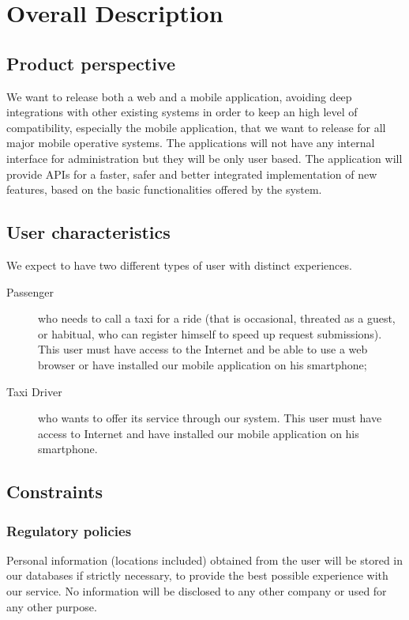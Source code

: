 \documentclass{article}
\begin{document}
\section{Overall Description}
	\subsection{Product perspective}
		We want to release both a web and a mobile application, avoiding deep
		integrations with other existing systems in order to keep an high level
		of compatibility, especially the mobile application, that we want to
		release for all major mobile operative systems. The applications will not
		have any internal interface for administration but they will be only user based.
		The application will provide APIs for a faster, safer and better integrated 
		implementation of new features, based on the basic functionalities
		offered by the system.
	\subsection{User characteristics}
		We expect to have two different types of user with distinct experiences. 
		\begin{description}
			\item[Passenger] who needs to call a taxi for a ride (that is occasional, threated
			as a guest, or habitual, who can register himself to speed up request submissions).
			This user must have access to the Internet and be able to use
			a web browser or have installed our mobile application on his smartphone;
			\item[Taxi Driver] who wants to offer its service through our system.
			This user must have access to Internet and have	installed our mobile
			application on his smartphone.
		\end{description}
	\subsection{Constraints}
		\subsubsection{Regulatory policies}
			Personal information (locations included) obtained from the	user will be stored
			in our databases if strictly necessary, to provide the best possible experience
			with our service. No information will be disclosed to any other company or
			used for any other purpose.
\end{document}
